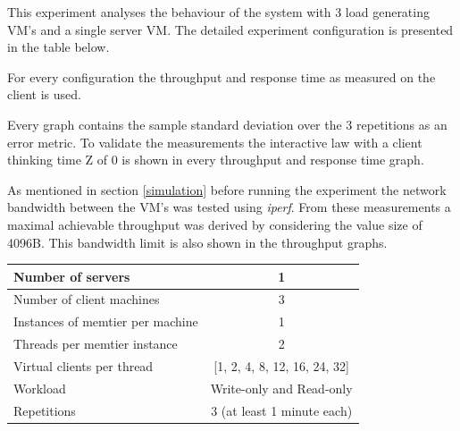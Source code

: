 \documentclass[11pt,a4paper]{article}
\begin{document}

This experiment analyses the behaviour of the system with 3 load generating VM's and a single server VM. The detailed experiment configuration is presented in the table below.

For every configuration the throughput and response time as measured on the client is used.

Every graph contains the sample standard deviation over the 3 repetitions as an error metric.
To validate the measurements the interactive law with a client thinking time Z of 0 is shown in every throughput and response time graph.

As mentioned in section \ref{simulation} before running the experiment the network bandwidth between the VM's was tested using \emph{iperf}. From these measurements a maximal achievable throughput was derived by considering the value size of 4096B. This bandwidth limit is also shown in the throughput graphs.


\begin{center}
	\scriptsize{
		\begin{tabular}{|l|c|}
			\hline Number of servers                & 1                        \\ 
			\hline Number of client machines        & 3                        \\ 
			\hline Instances of memtier per machine & 1                        \\ 
			\hline Threads per memtier instance     & 2                        \\
			\hline Virtual clients per thread       & [1, 2, 4, 8, 12, 16, 24, 32]\\ 
			\hline Workload                         & Write-only and Read-only \\
			\hline Repetitions                      & 3 (at least 1 minute each)\\ 
			\hline 
		\end{tabular}
	}
\end{center}
\end{document}
